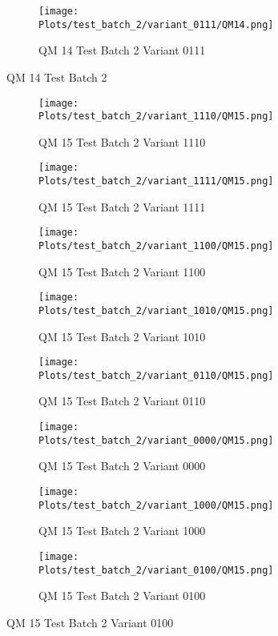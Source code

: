 \documentclass{DissertateFigs}
\begin{document}
\begin{figure}[t!]
\medskip

    \begin{subfigure}{0.47\textwidth}
    \texttt{[image: Plots/test\_batch\_2/variant\_0111/QM14.png]}
    \caption{QM 14 Test Batch 2 Variant 0111}
    \end{subfigure}
\caption{QM 14 Test Batch 2}
    \end{figure}
\clearpage
\begin{figure}[t!]
    \begin{subfigure}{0.32\textwidth}
    \texttt{[image: Plots/test\_batch\_2/variant\_1110/QM15.png]}
    \caption{QM 15 Test Batch 2 Variant 1110}
    \end{subfigure}
    \begin{subfigure}{0.32\textwidth}
    \texttt{[image: Plots/test\_batch\_2/variant\_1111/QM15.png]}
    \caption{QM 15 Test Batch 2 Variant 1111}
    \end{subfigure}

\medskip

    \begin{subfigure}{0.32\textwidth}
    \texttt{[image: Plots/test\_batch\_2/variant\_1100/QM15.png]}
    \caption{QM 15 Test Batch 2 Variant 1100}
    \end{subfigure}
    \begin{subfigure}{0.32\textwidth}
    \texttt{[image: Plots/test\_batch\_2/variant\_1010/QM15.png]}
    \caption{QM 15 Test Batch 2 Variant 1010}
    \end{subfigure}

\medskip

    \begin{subfigure}{0.32\textwidth}
    \texttt{[image: Plots/test\_batch\_2/variant\_0110/QM15.png]}
    \caption{QM 15 Test Batch 2 Variant 0110}
    \end{subfigure}
    \begin{subfigure}{0.32\textwidth}
    \texttt{[image: Plots/test\_batch\_2/variant\_0000/QM15.png]}
    \caption{QM 15 Test Batch 2 Variant 0000}
    \end{subfigure}

\medskip

    \begin{subfigure}{0.32\textwidth}
    \texttt{[image: Plots/test\_batch\_2/variant\_1000/QM15.png]}
    \caption{QM 15 Test Batch 2 Variant 1000}
    \end{subfigure}
    \begin{subfigure}{0.32\textwidth}
    \texttt{[image: Plots/test\_batch\_2/variant\_0100/QM15.png]}
    \caption{QM 15 Test Batch 2 Variant 0100}
    \end{subfigure}


\end{figure}
\end{document}

